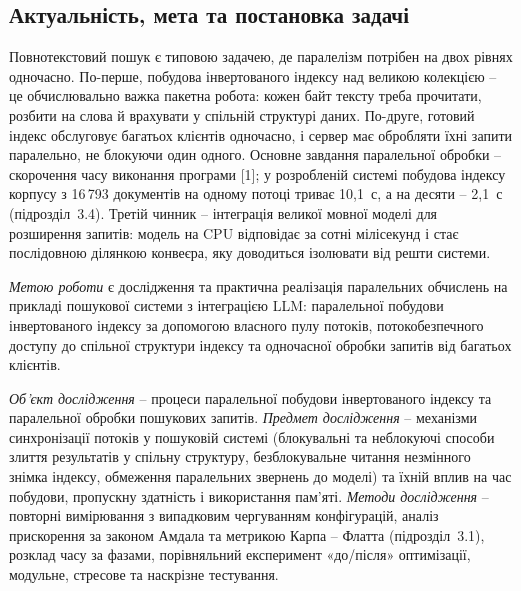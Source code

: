 
\subsection*{Актуальність, мета та постановка задачі}

Повнотекстовий пошук є типовою задачею, де паралелізм потрібен на двох рівнях одночасно.
По-перше, побудова інвертованого індексу над великою колекцією -- це обчислювально важка
пакетна робота: кожен байт тексту треба прочитати, розбити на слова й врахувати у
спільній структурі даних. По-друге, готовий індекс обслуговує багатьох клієнтів одночасно, і
сервер має обробляти їхні запити паралельно, не блокуючи один одного. Основне завдання
паралельної обробки -- скорочення часу виконання програми [1]; у розробленій системі
побудова індексу корпусу з 16\,793 документів на одному потоці триває 10,1~с, а на десяти --
2,1~с (підрозділ~3.4). Третій чинник -- інтеграція великої мовної моделі для розширення
запитів: модель на CPU відповідає за сотні мілісекунд і стає послідовною ділянкою конвеєра,
яку доводиться ізолювати від решти системи.

\textit{Метою роботи} є дослідження та практична реалізація паралельних обчислень на
прикладі пошукової системи з інтеграцією LLM: паралельної побудови інвертованого індексу за
допомогою власного пулу потоків, потокобезпечного доступу до спільної структури індексу та
одночасної обробки запитів від багатьох клієнтів.

\textit{Об'єкт дослідження} -- процеси паралельної побудови інвертованого індексу та
паралельної обробки пошукових запитів. \textit{Предмет дослідження} -- механізми
синхронізації потоків у пошуковій системі (блокувальні та неблокуючі способи злиття
результатів у спільну структуру, безблокувальне читання незмінного знімка індексу, обмеження
паралельних звернень до моделі) та їхній вплив на час побудови, пропускну здатність і
використання пам'яті. \textit{Методи дослідження} -- повторні вимірювання з випадковим
чергуванням конфігурацій, аналіз прискорення за законом Амдала та метрикою Карпа -- Флатта
(підрозділ~3.1), розклад часу за фазами, порівняльний експеримент «до/після» оптимізації,
модульне, стресове та наскрізне тестування.

